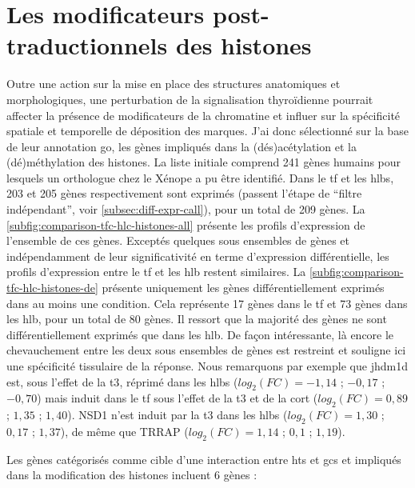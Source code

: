 \documentclass[../main.tex]{subfiles}
\begin{document}
	


\section{Les modificateurs post-traductionnels des histones}\label{sec:res-histones}

	Outre une action sur la mise en place des structures anatomiques et morphologiques, une perturbation de la signalisation thyroïdienne pourrait affecter la présence de modificateurs de la chromatine et influer sur la spécificité spatiale et temporelle de déposition des marques.
	J'ai donc sélectionné sur la base de leur annotation \gls{go}, les gènes impliqués dans la (dés)acétylation et la (dé)méthylation des histones.
	La liste initiale comprend 241 gènes humains pour lesquels un orthologue chez le Xénope a pu être identifié.
	Dans le \gls{tf} et les \glspl{hlb}, 203 et 205 gènes respectivement sont exprimés (passent l'étape de ``filtre indépendant'', voir \autoref{subsec:diff-expr-call}), pour un total de 209 gènes.
	La \autoref{subfig:comparison-tfc-hlc-histones-all} présente les profils d'expression de l'ensemble de ces gènes.
	Exceptés quelques sous ensembles de gènes et indépendamment de leur significativité en terme d'expression différentielle, les profils d'expression entre le \gls{tf} et les \gls{hlb} restent similaires.
	La \autoref{subfig:comparison-tfc-hlc-histones-de} présente uniquement les gènes différentiellement exprimés dans au moins une condition.
	Cela représente 17 gènes dans le \gls{tf} et 73 gènes dans les \gls{hlb}, pour un total de 80 gènes.
	Il ressort que la majorité des gènes ne sont différentiellement exprimés que dans les \gls{hlb}.
	De façon intéressante, là encore le chevauchement entre les deux sous ensembles de gènes est restreint et souligne ici une spécificité tissulaire de la réponse.
	Nous remarquons par exemple que \gls{jhdm1d} est, sous l'effet de la \gls{t3}, réprimé dans les \glspl{hlb} ($log_2(FC)=-1,14$ ; $-0,17$ ; $-0,70$) mais induit dans le \gls{tf} sous l'effet de la \gls{t3} et de la \gls{cort} ($log_2(FC)=0,89$ ; $1,35$ ; $1,40$).
	NSD1 n'est induit par la \gls{t3} dans les \glspl{hlb} ($log_2(FC)=1,30$ ; $0,17$ ; $1,37$), de même que TRRAP ($log_2(FC)=1,14$ ; $0,1$ ; $1,19$).
	\par
	Les gènes catégorisés comme cible d'une interaction entre \glspl{ht} et \glspl{gc} et impliqués dans la modification des histones incluent 6 gènes :
\end{document}
